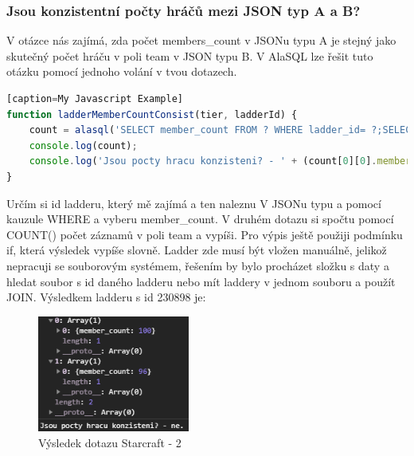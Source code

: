 \documentclass[a4, titlepage]{article}
\begin{document}
\subsubsection{Jsou konzistentní počty hráčů mezi JSON typ A a B?}
V otázce nás zajímá, zda počet members\_count v JSONu typu A je stejný jako skutečný počet hráču v poli team v JSON typu B. V AlaSQL lze řešit tuto otázku pomocí jednoho volání v tvou dotazech. 
\begin{lstlisting}[language=JavaScript][caption=My Javascript Example]
function ladderMemberCountConsist(tier, ladderId) {
    count = alasql('SELECT member_count FROM ? WHERE ladder_id= ?;SELECT COUNT(*) AS member_count FROM ?', [tier.tier[0].division, ladderId, ladder230898_1031.team])
    console.log(count);
    console.log('Jsou pocty hracu konzisteni? - ' + (count[0][0].member_count === count[1][0].member_count ? 'ano.' : 'ne.'));
}
\end{lstlisting}
Určím si id ladderu, který mě zajímá a ten naleznu V JSONu typu a pomocí kauzule WHERE a vyberu member\_count. V druhém dotazu si spočtu pomocí COUNT() počet záznamů v poli team a vypíši. Pro výpis ještě použiji podmínku if, která výsledek vypíše slovně.
Ladder zde musí být vložen manuálně, jelikož nepracuji se souborovým systémem, řešením by bylo procházet složku s daty a hledat soubor s id daného ladderu nebo mít laddery v jednom souboru a použít JOIN. Výsledkem ladderu s id 230898 je:
\begin{figure}[h]
    \centering
    \includegraphics[width=5cm]{S2}
    \caption{Výsledek dotazu Starcraft - 2}
\end{figure}
\end{document}
